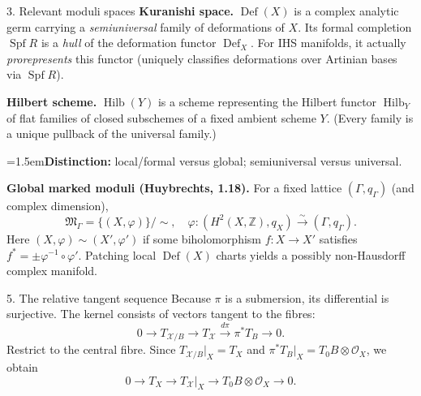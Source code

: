 \documentclass[aspectratio=169]{beamer}
\begin{document}
\begin{frame}{3. Relevant moduli spaces}
\small
\textbf{Kuranishi space.}
$\operatorname{Def}(X)$ is a complex analytic germ carrying a
\emph{semiuniversal} family of deformations of $X$.
Its formal completion $\operatorname{Spf}R$ is a
\emph{hull} of the deformation functor $\operatorname{Def}_X$.
For IHS manifolds, it actually \emph{prorepresents} this functor
(uniquely classifies deformations over Artinian bases via $\operatorname{Spf}R$).

\medskip
\textbf{Hilbert scheme.}
$\operatorname{Hilb}(Y)$ is a scheme representing the Hilbert
functor $\operatorname{Hilb}_Y$ of flat families of closed
subschemes of a fixed ambient scheme $Y$.
(Every family is a unique pullback of the universal family.)

\medskip
{\leftskip=1.5em\textbf{Distinction:} local/formal versus global;
semiuniversal versus universal.\par}

\bigskip
\textbf{Global marked moduli (Huybrechts, 1.18).}
For a fixed lattice $(\Gamma,q_\Gamma)$ (and complex dimension),
\[
\mathfrak M_\Gamma
=\{(X,\varphi)\}/\!\sim,\quad
\varphi:(H^2(X,\mathbb Z),q_X)\xrightarrow{\sim}(\Gamma,q_\Gamma).
\]
Here $(X,\varphi)\sim(X',\varphi')$ if some biholomorphism
$f:X\to X'$ satisfies $f^*=\pm\varphi^{-1}\circ\varphi'$.
Patching local $\operatorname{Def}(X)$ charts yields a
possibly non-Hausdorff complex manifold.
\end{frame}

\begin{frame}{5. The relative tangent sequence}
Because $\pi$ is a submersion, its differential is surjective.
The kernel consists of vectors tangent to the fibres:
\[
0\longrightarrow T_{\mathcal X/B}
\longrightarrow T_{\mathcal X}
\xrightarrow{d\pi}\pi^*T_B\longrightarrow0.
\]
Restrict to the central fibre. Since
$T_{\mathcal X/B}|_X=T_X$ and
$\pi^*T_B|_X=T_0B\otimes\mathcal O_X$, we obtain
\[
\boxed{0\longrightarrow T_X\longrightarrow
T_{\mathcal X}|_X\longrightarrow
T_0B\otimes\mathcal O_X\longrightarrow0.}
\]
\end{frame}
\end{document}
